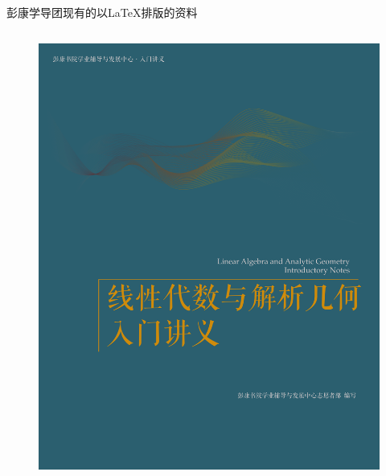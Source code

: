 \begin{frame}{彭康学导团现有的以\LaTeX 排版的资料}
\begin{itemize}
\begin{columns}
\begin{column}{0.48\textwidth}
\begin{figure}
                    \includegraphics[scale=0.2]{figures/PK_XD.pdf}
                \end{figure}
            \end{column}
        \end{columns}
    \end{itemize}
\end{frame}

